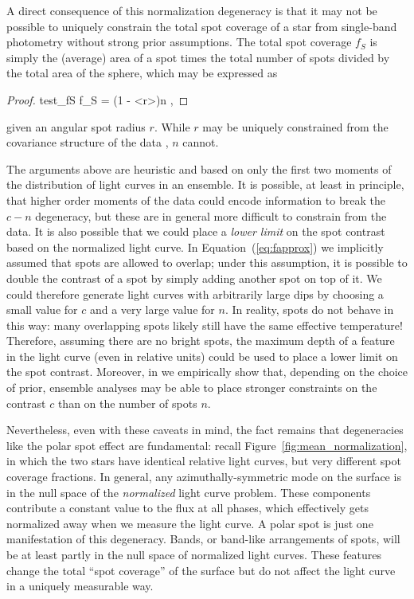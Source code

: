 \documentclass[modern]{aastex62}
\begin{document}
A direct consequence of this normalization degeneracy is that it may not be
possible to uniquely constrain the total spot coverage of a star from
single-band photometry without strong prior assumptions.
The total spot coverage $f_S$
is simply the (average) area of a spot
times the total number of spots divided by the total area of the sphere, which
may be expressed as
%
\begin{proof}{test_fS}
    \label{eq:fS}
    f_S = \left(1 - \left<\cos r\right>\right)n
    \quad,
\end{proof}
%
given an angular spot radius $r$.
While $r$ may be uniquely constrained from the covariance structure of the data
, $n$ cannot.

The arguments above are heuristic and based on only the first two moments
of the distribution of light curves in an ensemble.
It is possible, at least in principle, that higher order moments of the data
could encode information to
break the $c-n$ degeneracy, but these are in general more difficult
to constrain from the data. It is also possible that we could place a
\emph{lower limit} on the spot contrast based on the normalized light
curve. In Equation~(\ref{eq:fapprox}) we implicitly assumed that
spots are allowed to overlap; under this assumption, it is possible to
double the contrast of a spot by simply adding another spot on top
of it. We could therefore generate light curves with arbitrarily
large dips by choosing a small value for $c$ and a very large value for $n$.
In reality, spots do not behave in this way: many overlapping spots
likely still have the same effective temperature! Therefore,
assuming there are no bright spots,
the maximum depth of a feature in the light curve (even in relative units)
could be used to place a lower limit on the spot contrast.
Moreover, in  we empirically show that, depending on the choice
of prior, ensemble analyses may be able to place stronger constraints on
the contrast $c$ than on the number of spots $n$.

Nevertheless, even with these caveats in mind, the fact remains
that degeneracies like the polar spot effect are fundamental: recall
Figure~\ref{fig:mean_normalization}, in which the two stars
have identical relative light curves, but very different spot coverage
fractions. In general, any azimuthally-symmetric mode on the surface
is in the null space of the \emph{normalized} light curve problem. These
components contribute a constant value to the flux at all phases, which
effectively gets normalized away when we measure the light curve. A
polar spot is just one manifestation of this degeneracy. Bands, or
band-like arrangements of spots, will be at least partly in the null
space of normalized light curves. These features change the total ``spot coverage''
of the surface but do not affect the light curve in a uniquely measurable
way.
\end{document}
